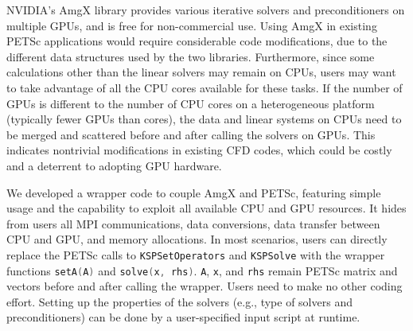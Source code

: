 NVIDIA's AmgX library provides various iterative solvers and preconditioners
on multiple GPUs, and is free for non-commercial use.
Using AmgX in existing PETSc applications would require considerable
code modifications, due to the different data structures used by the two libraries.
Furthermore, since some calculations other than the linear solvers may remain on CPUs,
users may want to take advantage of all the CPU cores available for these tasks.
If the number of GPUs is different to the number of CPU cores on a 
heterogeneous platform (typically fewer GPUs than cores),
the data and linear systems on CPUs need to be merged and scattered before 
and after calling the solvers on GPUs.
This indicates nontrivial modifications in existing CFD codes, 
which could be costly and a deterrent to adopting GPU hardware.

We developed a wrapper code to couple AmgX and PETSc,  featuring simple
usage and the capability to exploit all available CPU and GPU resources.
It hides from users all MPI communications, data conversions, data transfer between CPU 
and GPU, and memory allocations.
In most scenarios, users can directly replace the PETSc calls to
\lstinline[language=C++, basicstyle=\ttfamily]|KSPSetOperators| and 
\lstinline[language=C++, basicstyle=\ttfamily]|KSPSolve| 
with the wrapper functions
\lstinline[language=C++, basicstyle=\ttfamily]|setA(A)| and
\lstinline[language=C++, basicstyle=\ttfamily]|solve(x, rhs)|.
\lstinline[language=C++, basicstyle=\ttfamily]|A|,
\lstinline[language=C++, basicstyle=\ttfamily]|x|, and
\lstinline[language=C++, basicstyle=\ttfamily]|rhs|
remain PETSc matrix and vectors before and after calling the wrapper.
Users need to make no other coding effort.
Setting up the properties of the solvers (e.g., type of solvers and 
preconditioners) can be done by a user-specified input script at runtime.

